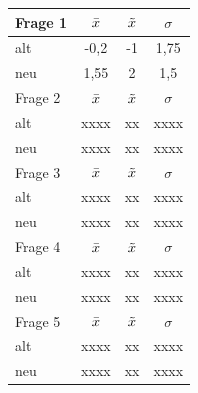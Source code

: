 \begin{table}[H]
\justifying
\begin{tabular}{|l|c|c|c|}
\hline
Frage 1   & $\Bar{x}$ & $\Tilde{x}$ & $\sigma$ \\ \hline
alt       & -0,2      & -1          & 1,75     \\ \hline
neu       & 1,55      & 2           & 1,5      \\ \hline
\hline
Frage 2   & $\Bar{x}$ & $\Tilde{x}$ & $\sigma$ \\ \hline
alt       & xxxx      &  xx         &  xxxx    \\ \hline
neu       & xxxx      &  xx         &  xxxx    \\ \hline
\hline
Frage 3   & $\Bar{x}$ & $\Tilde{x}$ & $\sigma$ \\ \hline
alt       & xxxx      &  xx         &  xxxx    \\ \hline
neu       & xxxx      &  xx         &  xxxx    \\ \hline
\hline
Frage 4   & $\Bar{x}$ & $\Tilde{x}$ & $\sigma$ \\ \hline
alt       & xxxx      &  xx         &  xxxx    \\ \hline
neu       & xxxx      &  xx         &  xxxx    \\ \hline
\hline
Frage 5   & $\Bar{x}$ & $\Tilde{x}$ & $\sigma$ \\ \hline
alt       & xxxx      &  xx         &  xxxx    \\ \hline
neu       & xxxx      &  xx         &  xxxx    \\ \hline

\end{tabular}
\end{table}
